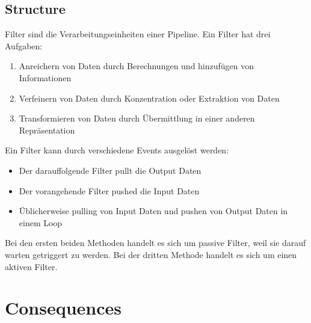 \subsection{Structure}
Filter sind die Verarbeitungseinheiten einer Pipeline. Ein Filter hat drei Aufgaben:
\begin{enumerate}
	\item Anreichern von Daten durch Berechnungen und hinzufügen von Informationen
	\item Verfeinern von Daten durch Konzentration oder Extraktion von Daten
	\item Transformieren von Daten durch Übermittlung in einer anderen Repräsentation
\end{enumerate}
Ein Filter kann durch verschiedene Events ausgelöst werden:
\begin{itemize}
	\item Der darauffolgende Filter pullt die Output Daten
	\item Der vorangehende Filter pushed die Input Daten
	\item Üblicherweise pulling von Input Daten und pushen von Output Daten in einem Loop
\end{itemize}
Bei den ersten beiden Methoden handelt es sich um passive Filter, weil sie darauf warten getriggert zu werden. Bei der dritten Methode handelt es sich um einen aktiven Filter.


\section{Consequences}
\begin{itemize}
    
\end{itemize}

